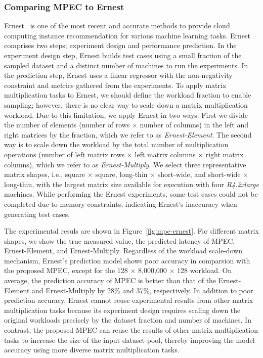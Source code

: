 \documentclass[10pt, conference, compsocconf]{IEEEtran}
\begin{document}
\subsubsection{Comparing MPEC to Ernest}
Ernest~\cite{ernest} is one of the most recent and accurate methods to provide cloud computing instance recommendation for various machine learning tasks. Ernest comprises two steps; experiment design and performance prediction. In the experiment design step, Ernest builds test cases using a small fraction of the sampled dataset and a distinct number of machines to run the experiments. In the prediction step, Ernest uses a linear regressor with the non-negativity constraint and metrics gathered from the experiments. To apply matrix multiplication tasks to Ernest, we should define the workload fraction to enable sampling; however, there is no clear way to scale down a matrix multiplication workload. Due to this limitation, we apply Ernest in two ways. First we divide the number of elements (number of rows $\times$ number of columns) in the left and right matrices by the fraction, which we refer to as \textit{Ernest-Element}. The second way is to scale down the workload by the total number of multiplication operations (number of left matrix rows $\times$ left matrix columns $\times$ right matrix columns), which we refer to as \textit{Ernest-Multiply}. We select three representative matrix shapes, i.e., square $\times$ square, long-thin $\times$ short-wide, and short-wide $\times$ long-thin, with the largest matrix size available for execution with four \textit{R4.2xlarge} machines. While performing the Ernest experiments, some test cases could not be completed due to memory constraints, indicating Ernest's inaccuracy when generating test cases.

The experimental resuls are shown in Figure~\ref{fig:mpc-ernest}. For different matrix shapes, we show the true measured value, the predicted latency of MPEC, Ernest-Element, and Ernest-Multiply. Regardless of the workload scale-down mechanism, Ernest's prediction model shows poor accuracy in comparsion with the proposed MPEC, except for the 128 $\times$ 8,000,000 $\times$ 128 workload. On average, the prediction accuracy of MPEC is better than that of the Ernest-Element and Ernest-Multiply by 28\% and 37\%, respectively. In addition to poor prediction accuracy, Ernest cannot reuse experimental results from other matrix multiplication tasks because its experiment design requires scaling down the original workloads precisely by the dataset fraction and number of machines. In contrast, the proposed MPEC can reuse the results of other matrix multiplication tasks to increase the size of the input dataset pool, thereby improving the model accuracy using more diverse matrix multiplication tasks.
\end{document}
